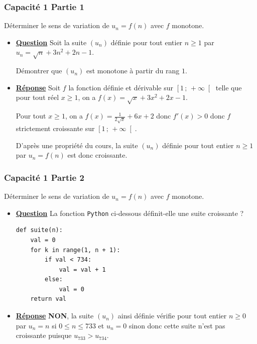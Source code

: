 \documentclass[11pt, hyperref={urlcolor=red,%
            linkcolor=blue, %
            colorlinks=true}]{beamer}
\newcommand{\Interfo}[2]{\left[#1\, ;\, #2\right[}
\newcommand{\suite}[1]{\ensuremath{\left(#1_{n}\right)}}
\begin{document}
\begin{frame}
\frametitle{Capacité 1 Partie 1}
\label{capacite1}

Déterminer le sens de variation de $u_{n}=f(n)$ avec $f$ monotone.

\begin{itemize}
	\item \underline{\textbf{Question}} Soit la suite $\suite{u}$ définie pour tout entier $n \geqslant 1$ par $u_{n}=\sqrt{n} + 3n^{2}+2n-1$.
	
	 Démontrer que $\suite{u}$ est monotone à partir du rang $1$.
	
	
\pause 	\item \underline{\textbf{Réponse}} Soit $f$ la fonction définie et dérivable sur $\Interfo{1}{+\infty}$ telle que pour tout réel $x \geqslant  1$, on a $f(x)=\sqrt{x} + 3x^{2}+2x-1$.

Pour tout $x \geqslant 1$, on a $f(x)=\frac{1}{2\sqrt{x}} + 6x + 2$ donc $f'(x)>0$ donc $f$ strictement croissante sur $\Interfo{1}{+\infty}$.

D'après une propriété du cours, la suite $\suite{u}$ définie pour tout entier $n \geqslant 1$ par $u_{n}=f(n)$ est donc croissante.
	
\end{itemize}


\end{frame}



\begin{frame}[fragile]
\frametitle{Capacité 1 Partie 2}


Déterminer le sens de variation de $u_{n}=f(n)$ avec $f$ monotone.
\begin{itemize}
	\item \underline{\textbf{Question}} La fonction \texttt{Python} ci-dessous définit-elle une suite croissante ?
	
\begin{lstlisting}[style=rond]
def suite(n):
	val = 0
	for k in range(1, n + 1):
		if val < 734:
			val = val + 1
		else:
			val = 0
	return val
\end{lstlisting}
	
	
\pause 	\item \underline{\textbf{Réponse}} \textbf{NON}, la suite $\suite{u}$ ainsi définie vérifie pour tout entier $n \geqslant 0$ par $u_{n}=n$ si $0 \leqslant n \leqslant 733$ et $u_{n}=0$ sinon donc cette suite n'est pas croissante puisque $u_{733}>u_{734}$.
\end{itemize}


\end{frame}
\end{document}
